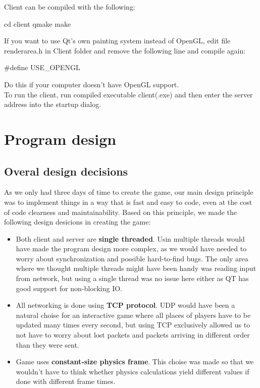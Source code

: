 \documentclass[a4paper,12pt,titlepage]{article}
\begin{document}
Client can be compiled with the following:
    \begin{verbatimtab}[3]
        cd client
        qmake
        make
    \end{verbatimtab}
If you want to use Qt's own painting system instead of OpenGL, edit file renderarea.h in Client folder and remove the following line and compile again: 
    \begin{verbatimtab}[3]
        #define USE_OPENGL
    \end{verbatimtab}
Do this if your computer doesn't have OpenGL support.\\
To run the client, run compiled executable client(.exe) and then enter the server address into the startup dialog.

\section{Program design}

\subsection{Overal design decisions}

As we only had three days of time to create the game, our main design principle was to implement things in a way that is fast and easy to code, even at the cost of code clearness and maintainability. Based on this principle, we made the following design desicions in creating the game:
\begin{itemize}
\item Both client and server are \textbf{single threaded}. Usin multiple threads would have made the program design more complex, as we would have needed to worry about synchronization and possible hard-to-find bugs. The only area where we thought multiple threads might have been handy was reading input from network, but using a single thread was no issue here either as QT has good support for non-blocking IO.
\item All networking is done using \textbf{TCP protocol}. UDP would have been a natural choise for an interactive game where all places of players have to be updated many times every second, but using TCP exclusively allowed us to not have to worry about lost packets and packets arriving in different order than they were sent.
\item Game uses \textbf{constant-size physics frame}. This choise was made so that we wouldn't have to think whether physics calculations yield different values if done with different frame times.
\end{itemize}
\end{document}
